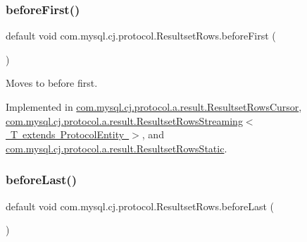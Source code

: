 \mbox{\label{interfacecom_1_1mysql_1_1cj_1_1protocol_1_1_resultset_rows_ae7c525fda08befaf356a5a0df5c78086}} 
\subsubsection{\texorpdfstring{before\+First()}{beforeFirst()}}
{\footnotesize\ttfamily default void com.\+mysql.\+cj.\+protocol.\+Resultset\+Rows.\+before\+First (\begin{DoxyParamCaption}{ }\end{DoxyParamCaption})}

Moves to before first. 

Implemented in \mbox{\hyperlink{classcom_1_1mysql_1_1cj_1_1protocol_1_1a_1_1result_1_1_resultset_rows_cursor_a3f7a11c46baddfde2c6ad5cc16c101d7}{com.\+mysql.\+cj.\+protocol.\+a.\+result.\+Resultset\+Rows\+Cursor}}, \mbox{\hyperlink{classcom_1_1mysql_1_1cj_1_1protocol_1_1a_1_1result_1_1_resultset_rows_streaming_a09c61e1550747c9af885193ffe222c04}{com.\+mysql.\+cj.\+protocol.\+a.\+result.\+Resultset\+Rows\+Streaming$<$ T extends Protocol\+Entity $>$}}, and \mbox{\hyperlink{classcom_1_1mysql_1_1cj_1_1protocol_1_1a_1_1result_1_1_resultset_rows_static_a0621988f2c4896700500decf7b6298a2}{com.\+mysql.\+cj.\+protocol.\+a.\+result.\+Resultset\+Rows\+Static}}.

\mbox{\label{interfacecom_1_1mysql_1_1cj_1_1protocol_1_1_resultset_rows_a5e79d9c2bb5bcfb947e02b71121d74d2}} 
\subsubsection{\texorpdfstring{before\+Last()}{beforeLast()}}
{\footnotesize\ttfamily default void com.\+mysql.\+cj.\+protocol.\+Resultset\+Rows.\+before\+Last (\begin{DoxyParamCaption}{ }\end{DoxyParamCaption})}

